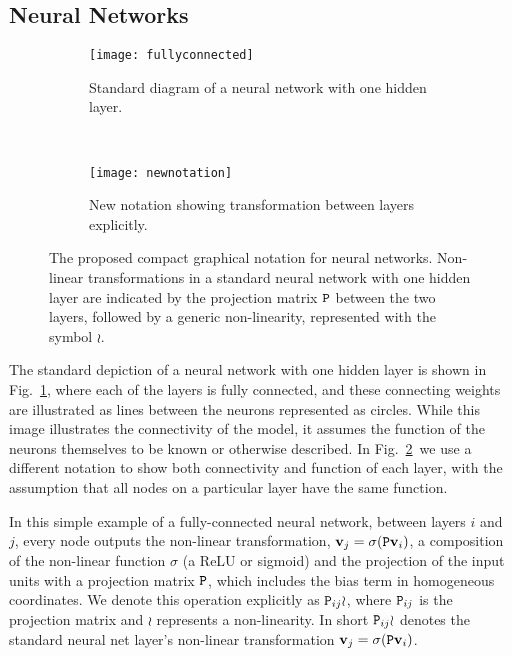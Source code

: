 \documentclass[thesis]{subfiles}
\begin{document}
\subsection{Neural Networks}
\begin{figure}[htbp!] 
\centering
\begin{subfigure}[b]{0.45\textwidth}
   \centering
   \texttt{[image: fullyconnected]}
   \caption{Standard diagram of a neural network with one hidden layer.}
   \label{fig:oldnotation}
\end{subfigure}
~
\begin{subfigure}[b]{0.45\textwidth}
   \centering
   \texttt{[image: newnotation]}
   \caption{New notation showing transformation between layers explicitly.}
   \label{fig:newnotation}
\end{subfigure}
\caption[New graphical notation for a standard neural network with one hidden layer.]{The proposed compact graphical notation for neural networks. Non-linear transformations in a standard neural network with one hidden layer are indicated by the projection matrix $\mat P$ between the two layers, followed by a generic non-linearity, represented with the symbol $\wr$.}
\label{fig:newGraphLanguage}
\end{figure}

The standard depiction of a neural network with one hidden layer is shown in Fig.~\ref{fig:oldnotation}, where each of the layers is fully connected, and these connecting weights are illustrated as lines between the neurons represented as circles. While this image illustrates the connectivity of the model, it assumes the function of the neurons themselves to be known or otherwise described. In Fig.~\ref{fig:newnotation}\ we use a different notation to show both connectivity and function of each layer, with the assumption that all nodes on a particular layer have the same function.

In this simple example of a fully-connected neural network, between layers $i$ and $j$, every node outputs the non-linear transformation, $\vec v_j = \sigma(\mat P \vec v_i)$, a composition of the non-linear function $\sigma$ (\eg a ReLU or sigmoid) and the projection of the input units with a projection matrix $\mat P$, which includes the bias term in homogeneous coordinates. We denote this operation explicitly as $\mat P_{ij} \wr$, where $\mat P_{ij}$ is the projection matrix and $\wr$ represents a non-linearity. In short $\mat P_{ij} \wr$ denotes the standard neural net layer's non-linear transformation $\vec v_j = \sigma(\mat P \vec v_i)$. 
\end{document}
